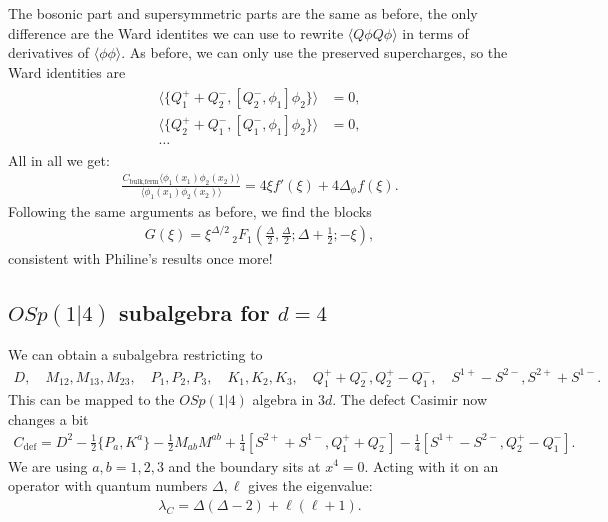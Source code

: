 \documentclass[letterpaper]{article}
\let\Oldsubsection\subsection
\renewcommand{\subsection}{\FloatBarrier\Oldsubsection}
\begin{document}
The bosonic part and supersymmetric parts are the same as before, the only difference are the Ward identites we can use to rewrite $\langle Q\phi Q\phi \rangle$ in terms of derivatives of $\langle \phi \phi \rangle$.
As before, we can only use the preserved supercharges, so the Ward identities are
\begin{align}
\begin{split}
 \langle \{ Q^+_1 + Q^-_2, [Q^-_2, \phi_1] \phi_2 \} \rangle & = 0, \\
 \langle \{ Q^+_2 + Q^-_1, [Q^-_1, \phi_1] \phi_2 \} \rangle & = 0, \\
 \ldots
\end{split}
\end{align}
All in all we get:
\begin{align}
 \frac{C_{\text{bulk,ferm}} \langle \phi_1(x_1) \phi_2(x_2) \rangle}
      {\langle \phi_1(x_1) \phi_2(x_2) \rangle}
 = 4 \xi  f'(\xi )
 + 4 \Delta_\phi f(\xi ).
\end{align}
Following the same arguments as before, we find the blocks
\begin{align}
 G(\xi) 
 = \xi ^{\Delta /2} \, _2F_1\left(\frac{\Delta }{2},\frac{\Delta }{2};\Delta +\frac{1}{2};-\xi \right),
\end{align}
consistent with Philine's results once more!

\subsection{\texorpdfstring{$OSp(1|4)$}{OSP(1|4)} subalgebra
for \texorpdfstring{$d = 4$}{d=4}}

We can obtain a subalgebra restricting to
\begin{align}
 D, \quad
 M_{12}, M_{13}, M_{23}, \quad
 P_1, P_2, P_3, \quad
 K_1, K_2, K_3, \quad
 Q^+_1 + Q^-_2, Q^+_2 - Q^-_1, \quad
 S^{1+} - S^{2-}, S^{2+} + S^{1-}.
\end{align}
This can be mapped to the $OSp(1|4)$ algebra in $3d$.
The defect Casimir now changes a bit
\begin{align}
 C_{\text{def}} = 
    D^2
  - \frac12 \{ P_{a}, K^{a} \}
  - \frac12 M_{ab} M^{ab}
  + \frac14 [ S^{2+} + S^{1-}, Q^+_1 + Q^-_2]
  - \frac14 [ S^{1+} - S^{2-}, Q^+_2 - Q^-_1].
\end{align}
We are using $a, b = 1, 2, 3$ and the boundary sits at $x^4 = 0$.
Acting with it on an operator with quantum numbers $\Delta, \ell$ gives the eigenvalue:
\begin{align}
 \lambda_C 
 = \Delta (\Delta - 2)
 + \ell(\ell + 1).
\end{align}
\end{document}
